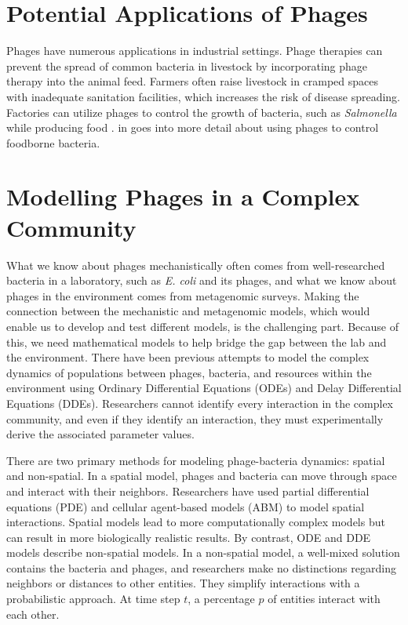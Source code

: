 \section{Potential Applications of Phages}
Phages have numerous applications in industrial settings. 
Phage therapies can prevent the spread of common bacteria in livestock by incorporating phage therapy into the animal feed. 
Farmers often raise livestock in cramped spaces with inadequate sanitation facilities, which increases the risk of disease spreading. 
Factories can utilize phages to control the growth of bacteria, such as \textit{Salmonella} while producing food \cite{sofferBacteriophagesSafelyReduce2016, kowalskaFreshVegetablesFruit2023}. 
 in  goes into more detail about using phages to control foodborne bacteria. 

\section{Modelling Phages in a Complex Community}
What we know about phages mechanistically often comes from well-researched bacteria in a laboratory, such as \textit{E. coli} and its phages, and what we know about phages in the environment comes from metagenomic surveys. 
Making the connection between the mechanistic and metagenomic models, which would enable us to develop and test different models, is the challenging part. 
Because of this, we need mathematical models to help bridge the gap between the lab and the environment. 
There have been previous attempts to model the complex dynamics of populations between phages, bacteria, and resources within the environment using Ordinary Differential Equations (ODEs) and Delay Differential Equations (DDEs).
Researchers cannot identify every interaction in the complex community, and even if they identify an interaction, they must experimentally derive the associated parameter values. 

There are two primary methods for modeling phage-bacteria dynamics: spatial and non-spatial.
In a spatial model, phages and bacteria can move through space and interact with their neighbors. 
Researchers have used partial differential equations (PDE) and cellular agent-based models (ABM) to model spatial interactions.
Spatial models lead to more computationally complex models but can result in more biologically realistic results. 
By contrast, ODE and DDE models describe non-spatial models. 
In a non-spatial model, a well-mixed solution contains the bacteria and phages, and researchers make no distinctions regarding neighbors or distances to other entities. 
They simplify interactions with a probabilistic approach.
At time step $t$, a percentage $p$ of entities interact with each other.

